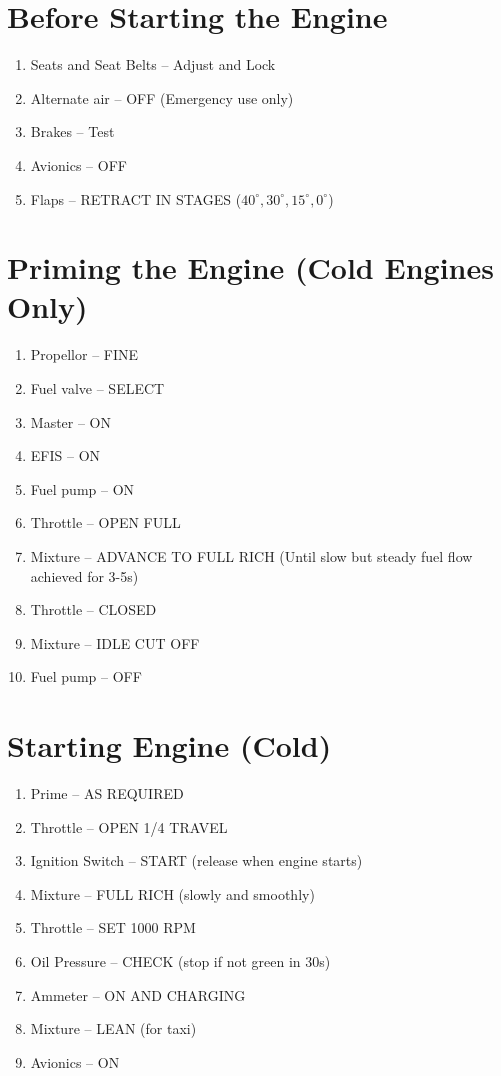 \section{Before Starting the Engine}
\begin{enumerate}[(1)]
  \item Seats and Seat Belts -- Adjust and Lock
  \item Alternate air -- OFF (Emergency use only)
  \item Brakes -- Test
  \item Avionics -- OFF
  \item Flaps -- RETRACT IN STAGES ($40^\circ, 30^\circ, 15^\circ, 0^\circ$)
\end{enumerate}

\section{Priming the Engine (Cold Engines Only)}
\begin{enumerate}[(1)]
  \item Propellor -- FINE
  \item Fuel valve -- SELECT
  \item Master -- ON
  \item EFIS -- ON
  \item Fuel pump -- ON
  \item Throttle -- OPEN FULL
  \item Mixture -- ADVANCE TO FULL RICH (Until slow but steady fuel flow achieved for 3-5s)
  \item Throttle -- CLOSED
  \item Mixture -- IDLE CUT OFF
  \item Fuel pump -- OFF
\end{enumerate}

\section{Starting Engine (Cold)}
\begin{enumerate}[(1)]
  \item Prime -- AS REQUIRED
  \item Throttle -- OPEN 1/4 TRAVEL
  \item Ignition Switch -- START (release when engine starts)
  \item Mixture -- FULL RICH (slowly and smoothly)
  \item Throttle -- SET 1000 RPM
  \item Oil Pressure -- CHECK (stop if not green in 30s)
  \item Ammeter -- ON AND CHARGING
  \item Mixture -- LEAN (for taxi)
  \item Avionics -- ON 
\end{enumerate}

